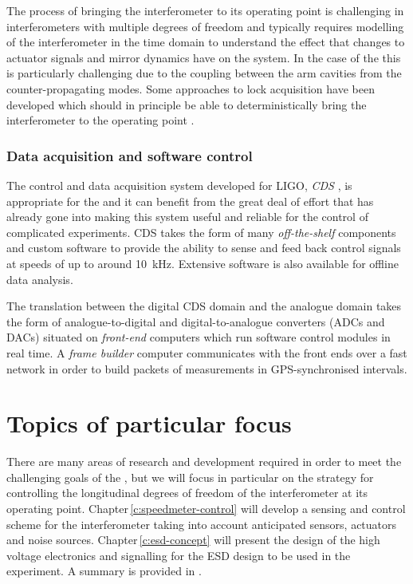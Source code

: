 The process of bringing the interferometer to its operating point is challenging in interferometers with multiple degrees of freedom and typically requires modelling of the interferometer in the time domain to understand the effect that changes to actuator signals and mirror dynamics have on the system. In the case of the \SSMEXPT{} this is particularly challenging due to the coupling between the arm cavities from the counter-propagating modes. Some approaches to lock acquisition have been developed which should in principle be able to deterministically bring the interferometer to the operating point \cite{Glaefke2015}.

\subsubsection{\label{sec:cds}Data acquisition and software control}
The control and data acquisition system developed for \gls{LIGO}, \emph{\gls{CDS}} \cite{Bork2010}, is appropriate for the \SSMEXPT{} and it can benefit from the great deal of effort that has already gone into making this system useful and reliable for the control of complicated experiments. \gls{CDS} takes the form of many \emph{off-the-shelf} components and custom software to provide the ability to sense and feed back control signals at speeds of up to around \SI{10}{\kilo\hertz}. Extensive software is also available for offline data analysis.

The translation between the digital \gls{CDS} domain and the analogue domain takes the form of analogue-to-digital and digital-to-analogue converters (\glspl{ADC} and \glspl{DAC}) situated on \emph{front-end} computers which run software control modules in real time. A \emph{frame builder} computer communicates with the front ends over a fast network in order to build packets of measurements in \gls{GPS}-synchronised intervals.

\section{Topics of particular focus}
There are many areas of research and development required in order to meet the challenging goals of the \SSMEXPT{}, but we will focus in particular on the strategy for controlling the longitudinal degrees of freedom of the interferometer at its operating point. Chapter\,\ref{c:speedmeter-control} will develop a sensing and control scheme for the interferometer taking into account anticipated sensors, actuators and noise sources. Chapter\,\ref{c:esd-concept} will present the design of the high voltage electronics and signalling for the \gls{ESD} design to be used in the experiment. A summary is provided in .